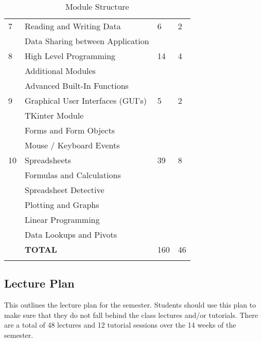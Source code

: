 \begin{longtable}{|p{2.0cm}|p{7.6cm}|p{2.0cm}|p{1.8cm}|}
             \hline
             7  & Reading and Writing Data                   &  6 & 2  \\
                & \qquad Data Sharing between Application    &    &    \\
             \hline
             8  & High Level Programming                     & 14 & 4  \\
                & \qquad Additional Modules                  &    &    \\
                & \qquad Advanced Built-In Functions         &    &    \\
             \hline
             9  & Graphical User Interfaces (GUI's)          &  5 & 2  \\
                & \qquad TKinter Module                      &    &    \\
                & \qquad Forms and Form Objects              &    &    \\
                & \qquad Mouse / Keyboard Events             &    &    \\
             \hline
             10 & Spreadsheets                               & 39 & 8  \\
                & \qquad Formulas and Calculations           &    &    \\
                & \qquad Spreadsheet Detective               &    &    \\
                & \qquad Plotting and Graphs                 &    &    \\
                & \qquad Linear Programming                  &    &    \\
                & \qquad Data Lookups and Pivots             &    &    \\
             \hline
                & {\bf TOTAL}                                &160 & 46 \\
             \hline

             \caption[Module Structure]{Module Structure} \label{tab:study_comp} \\
        \end{longtable}

    \subsection{Lecture Plan}
        This outlines the lecture plan for the semester. Students should use
        this plan to make sure that they do not fall behind the class
        lectures and/or tutorials. There are a total of 48 lectures and 12
        tutorial sessions over the 14 weeks of the semester.

